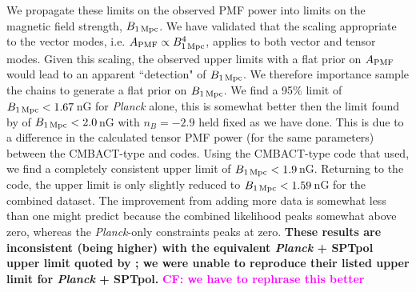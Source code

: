 \documentclass[apj]{emulateapj}
\newcommand{\apmf}{\ensuremath{A_{\rm PMF}}}
\newcommand{\bpmf}{\ensuremath{B_{\rm 1\,Mpc}}}
\newcommand{\planck}{{\sl Planck}}
\newcommand{\sptpol}{SPTpol}
\begin{document}
We propagate these limits on the observed PMF power into limits on the magnetic field strength, \bpmf. 
We have validated that the scaling appropriate to the vector modes, i.e. $\apmf \propto \bpmf^4$,  applies to both vector and tensor modes. 
Given this scaling, the observed upper limits with a flat prior on \apmf{} would lead to an apparent ``detection" of \bpmf. 
We therefore importance sample the chains to generate a flat prior on \bpmf. 
We find a 95\% limit of $\bpmf < \upperBplk$\,nG for \planck{} alone,
this is somewhat better then the limit found by \citet{planck15-19} of $\bpmf < 2.0$\,nG with $n_B=-2.9$ held fixed as we have done. This is due to a difference in the calculated tensor PMF power (for the same parameters) between the CMBACT-type and \citet{zucca16} codes. Using the CMBACT-type code that \citet{planck15-19} used, we find a completely consistent upper limit of $\bpmf < 1.9$\,nG. 
Returning to the  \citet{zucca16} code, the upper limit is only slightly reduced to $\bpmf < \upperBall$\,nG for the combined dataset. 
The improvement from adding more data is somewhat less than one might predict because the combined likelihood peaks somewhat above zero, whereas the \planck{}-only constraints peaks at zero. 
\textbf{These results are inconsistent (being higher) with the equivalent \planck{} + \sptpol{} upper limit quoted by \citet{zucca16}; we were unable to reproduce their listed upper limit for \planck{} + \sptpol{}.}  \textbf{\textcolor{magenta}{CF: we have to rephrase this better}}
\end{document}
